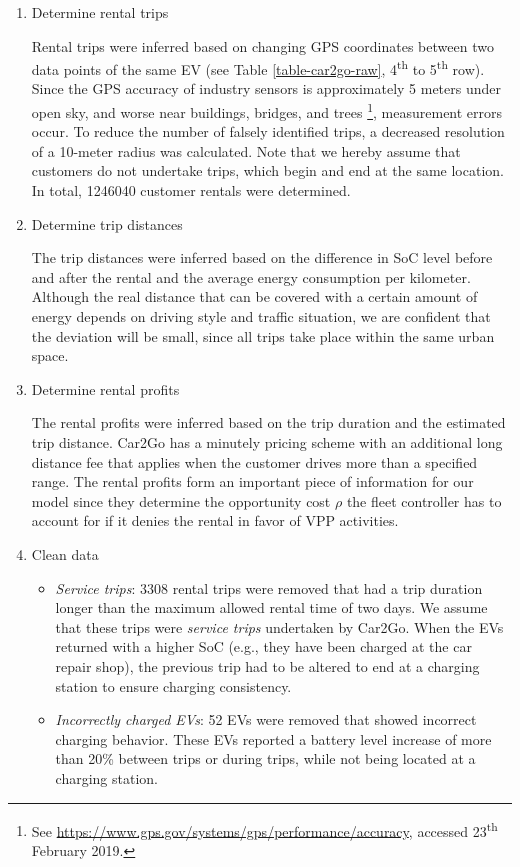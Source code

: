\documentclass[a4paper, 12pt]{article}
\begin{document}
\begin{enumerate}
\item Determine rental trips

Rental trips were inferred based on changing GPS coordinates between two data
points of the same EV (see Table \ref{table-car2go-raw}, 4\textsuperscript{th} to 5\textsuperscript{th} row).
Since the GPS accuracy of industry sensors is approximately 5 meters under
open sky, and worse near buildings, bridges, and trees \footnote{See \url{https://www.gps.gov/systems/gps/performance/accuracy}, accessed 23\textsuperscript{th} February 2019.}, measurement
errors occur. To reduce the number of falsely identified trips, a decreased
resolution of a 10-meter radius was calculated. Note that we hereby assume
that customers do not undertake trips, which begin and end at the same
location. In total, 1246040 customer rentals were determined.

\item Determine trip distances

The trip distances were inferred based on the difference in SoC level before
and after the rental and the average energy consumption per kilometer.
Although the real distance that can be covered with a certain amount of
energy depends on driving style and traffic situation, we are confident that
the deviation will be small, since all trips take place within the same urban
space.

\item Determine rental profits

The rental profits were inferred based on the trip duration and the estimated
trip distance. Car2Go has a minutely pricing scheme with an additional long
distance fee that applies when the customer drives more than a specified
range. The rental profits form an important piece of information for our
model since they determine the opportunity cost \(\rho\) the fleet controller
has to account for if it denies the rental in favor of VPP activities.

\item Clean data
\begin{itemize}
\item \emph{Service trips}: 3308 rental trips were removed that had a trip duration
longer than the maximum allowed rental time of two days. We assume that
these trips were \emph{service trips} undertaken by Car2Go. When the EVs
returned with a higher SoC (e.g., they have been charged at the car repair
shop), the previous trip had to be altered to end at a charging station to
ensure charging consistency.
\item \emph{Incorrectly charged EVs}: 52 EVs were removed that showed incorrect
charging behavior. These EVs reported a battery level increase of more than 20\%
between trips or during trips, while not being located at a charging station.
\end{itemize}
\end{enumerate}
\end{document}
